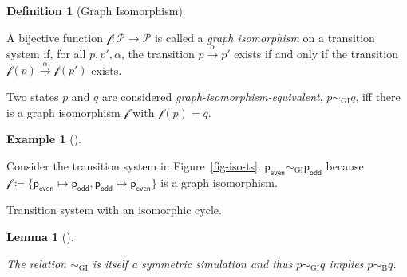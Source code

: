 \documentclass[
  a4paper,
]{report}
\theoremstyle{plain}
\theoremstyle{plain}
\theoremstyle{definition}
\newtheorem{definition}{Definition}[section]
\theoremstyle{plain}
\newtheorem{lemma}{Lemma}[section]
\theoremstyle{definition}
\newtheorem{example}{Example}[section]
\theoremstyle{remark}
\begin{document}
\begin{definition}[Graph
Isomorphism]\protect\hypertarget{def-graph-isomorphism}{}\label{def-graph-isomorphism}

A bijective function \(\mathcal{f} \colon \mathcal{P}\to \mathcal{P}\)
is called a \emph{graph isomorphism} on a transition system if, for all
\(p,p', α\), the transition \(p \xrightarrow{α} p'\) exists if and only
if the transition \(\mathcal{f}(p) \xrightarrow{α} \mathcal{f}(p')\)
exists.

Two states \(p\) and \(q\) are considered
\emph{graph-isomorphism-equivalent}, \(p \sim_\mathrm{GI} q\), iff there
is a graph isomorphism \(\mathcal{f}\) with \(\mathcal{f}(p) = q\).

\end{definition}

\begin{example}[]\protect\hypertarget{exm-graph-isomorphism}{}\label{exm-graph-isomorphism}

Consider the transition system in Figure~\ref{fig-iso-ts}.
\(\mathsf{p_{even}} \sim_\mathrm{GI} \mathsf{p_{odd}}\) because
\(\mathcal{f} ≔ \{\mathsf{p_{even}} \mapsto \mathsf{p_{odd}}, \mathsf{p_{odd}} \mapsto \mathsf{p_{even}}\}\)
is a graph isomorphism.

\begin{marginfigure}


\caption{\label{fig-iso-ts}Transition system with an isomorphic cycle.}

\end{marginfigure}%

\end{example}

\begin{lemma}[]\protect\hypertarget{lem-iso-impl-bisim}{}\label{lem-iso-impl-bisim}

The relation \(\sim_\mathrm{GI}\) is itself a symmetric simulation and
thus \(p \sim_\mathrm{GI} q\) implies \(p \sim_\mathrm{B} q\).

\end{lemma}
\end{document}
